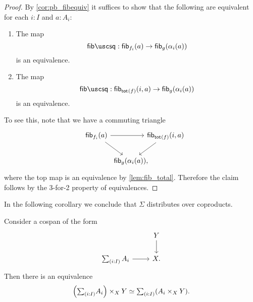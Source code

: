 \begin{proof}
By \cref{cor:pb_fibequiv} it suffices to show that the following are equivalent for each $i:I$ and $a:A_i$:
\begin{enumerate}
\item The map
\begin{equation*}
\fibsquare : \fib{f_i}{a} \to \fib{g}{\alpha_i(a)}
\end{equation*}
is an equivalence.
\item The map
\begin{equation*}
\fibsquare : \fib{\tot{f}}{i,a}\to \fib{g}{\alpha_i(a)}
\end{equation*}
is an equivalence.
\end{enumerate}
To see this, note that we have a commuting triangle
\begin{equation*}
\begin{tikzcd}[column sep=-1em]
\fib{f_i}{a} \arrow[rr] \arrow[dr] & & \fib{\tot{f}}{i,a} \arrow[dl] \\
\phantom{\fib{\tot{f}}{i,a}} & \fib{g}{\alpha_i(a)},
\end{tikzcd}
\end{equation*}
where the top map is an equivalence by \cref{lem:fib_total}. Therefore the claim follows by the 3-for-2 property of equivalences.
\end{proof}

In the following corollary we conclude that $\Sigma$ distributes over coproducts.

\begin{cor}
Consider a cospan of the form
\begin{equation*}
\begin{tikzcd}
& Y \arrow[d] \\
\sm{i:I}A_i \arrow[r] & X.
\end{tikzcd}
\end{equation*}
Then there is an equivalence
\begin{equation*}
\Big(\sm{i:I}A_i\Big)\times_X Y \simeq \sm{i:I} (A_i\times_X Y).
\end{equation*}
\end{cor}



